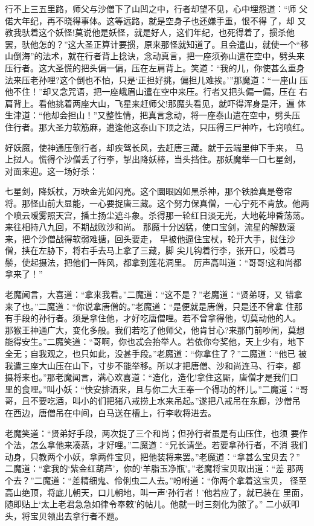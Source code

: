 行不上三五里路，师父与沙僧下了山凹之中，行者却望不见，心中埋怨道：“师
父偌大年纪，再不晓得事体。这等远路，就是空身子也还嫌手重，恨不得了，却
又教我驮着这个妖怪!莫说他是妖怪，就是好人，这们年纪，也死得着了，掼杀他
罢，驮他怎的？”这大圣正算计要掼，原来那怪就知道了。且会遣山，就使一个“移
山倒海”的法术，就在行者背上捻诀，念动真言，把一座须弥山遣在空中，劈头来
压行者。这大圣慌的把头偏一偏，压在左肩背上。笑道：“我的儿，你使甚么重身
法来压老孙哩?这个倒也不怕，只是‘正担好挑，偏担儿难挨。’”那魔道：“一座山
压他不住！”却又念咒语，把一座峨眉山遣在空中来压。行者又把头偏一偏，压在
右肩背上。看他挑着两座大山，飞星来赶师父!那魔头看见，就吓得浑身是汗，遍
体生津道：“他却会担山！”又整性情，把真言念动，将一座泰山遣在空中，劈头压
住行者。那大圣力软筋麻，遭逢他这泰山下顶之法，只压得三尸神咋，七窍喷红。

好妖魔，使神通压倒行者，却疾驾长风，去赶唐三藏。就于云端里伸下手来，
马上挝人。慌得个沙僧丢了行李，掣出降妖棒，当头挡住。那妖魔举一口七星剑，
对面来迎。这一场好杀：

七星剑，降妖杖，万映金光如闪亮。这个圜眼凶如黑杀神，那个铁脸真是卷帘
将。那怪山前大显能，一心要捉唐三藏。这个努力保真僧，一心宁死不肯放。他两
个喷云嗳雾照天宫，播土扬尘遮斗象。杀得那一轮红日淡无光，大地乾坤昏荡荡。
来往相持八九回，不期战败沙和尚。
那魔十分凶猛，使口宝剑，流星的解数滚来，把个沙僧战得软弱难搪，回头要走，
早被他逼住宝杖，轮开大手，挝住沙僧，挟在左胁下，将右手去马上拿了三藏，脚
尖儿钩着行李，张开口，咬着马鬃，使起摄法，把他们一阵风，都拿到莲花洞里。
厉声高叫道：“哥哥!这和尚都拿来了！”

老魔闻言，大喜道：“拿来我看。”二魔道：“这不是？”老魔道：“贤弟呀，又
错拿来了也。”二魔道：“你说拿唐僧的。”老魔道：“是便就是唐僧，只是还不曾拿
住那有手段的孙行者。须是拿住他，才好吃唐僧哩。若不曾拿得他，切莫动他的人。
那猴王神通广大，变化多般。我们若吃了他师父，他肯甘心?来那门前吵闹，莫想
能得安生。”二魔笑道：“哥啊，你也忒会抬举人。若依你夸奖他，天上少有，地下
全无；自我观之，也只如此，没甚手段。”老魔道：“你拿住了？”二魔道：“他已
被我遣三座大山压在山下，寸步不能举移。所以才把唐僧、沙和尚连马、行李，都
摄将来也。”那老魔闻言，满心欢喜道：“造化，造化!拿住这厮，唐僧才是我们口
里的食哩。”叫小妖：“快安排酒来，且与你二大王奉一个得功的杯儿。”二魔道：“哥
哥，且不要吃酒，叫小的们把猪八戒捞上水来吊起。”遂把八戒吊在东廊，沙僧吊
在西边，唐僧吊在中间，白马送在槽上，行李收将进去。

老魔笑道：“贤弟好手段，两次捉了三个和尚；但孙行者虽是有山压住，也须
要作个法，怎么拿他来凑蒸，才好哩。”二魔道：“兄长请坐。若要拿孙行者，不消
我们动身，只教两个小妖，拿两件宝贝，把他装将来罢。”老魔道：“拿甚么宝贝去？”
二魔道：“拿我的‘紫金红葫芦’，你的‘羊脂玉净瓶’。”老魔将宝贝取出道：“差
那两个去？”二魔道：“差精细鬼、伶俐虫二人去。”吩咐道：“你两个拿着这宝贝，
径至高山绝顶，将底儿朝天，口儿朝地，叫一声‘孙行者！’他若应了，就已装在
里面，随即贴上‘太上老君急急如律令奉敕’的帖儿。他就一时三刻化为脓了。”
二小妖叩头，将宝贝领出去拿行者不题。

